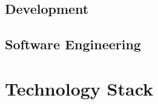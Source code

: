 \subsection{Development}












\subsection{Software Engineering}















\section{Technology Stack}



